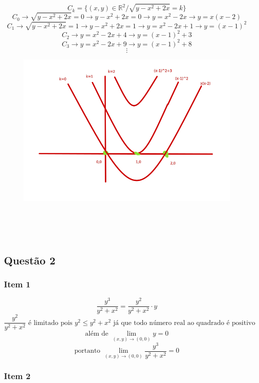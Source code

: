 \documentclass[12pt]{article}
\begin{document}
\[C_{k} = \lbrace (x,y) \in \mathds{R}^{2} / \sqrt{y-x^{2}+2x} = k \rbrace\]
\[C_{0} \longrightarrow \sqrt{y-x^{2}+2x} = 0 \longrightarrow y-x^{2}+2x = 0 \longrightarrow y = x^{2}-2x \longrightarrow y = x(x-2)\]
\[C_{1} \longrightarrow \sqrt{y-x^{2}+2x} = 1 \longrightarrow y-x^{2}+2x = 1 \longrightarrow y = x^{2}-2x+1 \longrightarrow y = (x-1)^{2}\]
\[C_{2} \longrightarrow  y = x^{2}-2x+4 \longrightarrow y = (x-1)^{2}+3\]
\[C_{3} \longrightarrow  y = x^{2}-2x+9 \longrightarrow y = (x-1)^{2}+8\]
\[\vdots\]
\begin{figure}[h!]
	\includegraphics[scale = 0.5]{q12}
\end{figure}\\\\\\

\subsection{Questão 2}
\subsubsection{Item 1}

\[\dfrac{y^{3}}{y^{2}+x^{2}} = \dfrac{y^{2}}{y^{2}+x^{2}} \cdot y\]
\[\dfrac{y^{2}}{y^{2}+x^{2}} \text{ é limitado pois } y^{2} \leq y^{2}+x^{2} \text{ já que todo número real ao quadrado é positivo}\]
\[\text{além de } \lim_{(x,y) \rightarrow (0,0)} y = 0\]
\[\text{portanto } \lim_{(x,y) \rightarrow (0,0)} \dfrac{y^{3}}{y^{2}+x^{2}} = 0\]

\subsubsection{Item 2}
\end{document}
